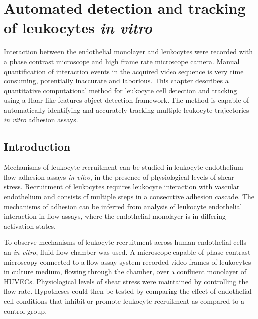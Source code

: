 \chapter{Automated detection and tracking of leukocytes \emph{in vitro}}
\label{leukocytes}
\ifpdf
    \graphicspath{{chapter_4/figs/}}
\fi

\nomenclature[g-pi]{$\pi$}{ $\simeq 3.14\ldots$}

Interaction between the endothelial monolayer and leukocytes were recorded with a phase contrast microscope and high frame rate microscope camera. Manual quantification of interaction events in the acquired video sequence is very time consuming, potentially inaccurate and laborious. This chapter describes a quantitative computational method for leukocyte cell detection and tracking using a Haar-like features object detection framework. The method is capable of automatically identifying and accurately tracking multiple leukocyte trajectories \emph{in vitro} adhesion assays.

\section{Introduction}
\label{leukocytes:introduction}
Mechanisms of leukocyte recruitment can be studied in leukocyte endothelium flow adhesion assays \emph{in vitro}, in the presence of physiological levels of shear stress. Recruitment of leukocytes requires leukocyte interaction with vascular endothelium and consists of multiple steps in a consecutive adhesion cascade. The mechanisms of adhesion can be inferred from analysis of leukocyte endothelial interaction in flow assays, where the endothelial monolayer is in differing activation states.

To observe mechanisms of leukocyte recruitment across human endothelial cells an \emph{in vitro}, fluid flow chamber was used. A microscope capable of phase contrast microscopy connected to a flow assay system recorded video frames of leukocytes in culture medium, flowing through the chamber, over a confluent monolayer of HUVECs. Physiological levels of shear stress were maintained by controlling the flow rate. Hypotheses could then be tested by comparing the effect of endothelial cell conditions that inhibit or promote leukocyte recruitment as compared to a control group.


